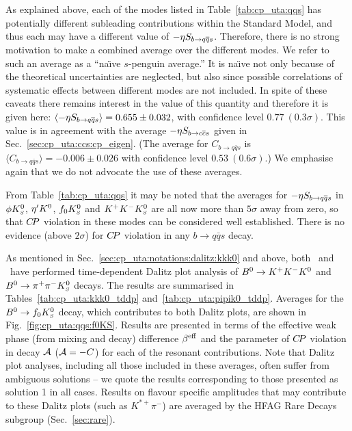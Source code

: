 As explained above,
each of the modes listed in Table~\ref{tab:cp_uta:qqs} has
potentially different subleading contributions within the Standard Model,
and thus each may have a different value of $-\etacp S_{b \to q\bar q s}$.
Therefore, there is no strong motivation to make a combined average
over the different modes.
We refer to such an average as a ``na\"\i ve $s$-penguin average.''
It is na\"\i ve not only because of the theoretical uncertainties are neglected,
but also since possible correlations of systematic effects 
between different modes are not included.
In spite of these caveats there remains interest in the value of this quantity
and therefore it is given here:
$\langle -\etacp S_{b \to q\bar q s} \rangle = 0.655 \pm 0.032$,
with confidence level $0.77~(0.3\sigma)$.
This value is in agreement with the average 
$-\etacp S_{b \to c\bar c s}$ given in Sec.~\ref{sec:cp_uta:ccs:cp_eigen}.
(The average for $C_{b \to q\bar q s}$ is 
$\langle C_{b \to q\bar q s} \rangle = -0.006 \pm 0.026$
with confidence level $0.53~(0.6\sigma)$.)
We emphasise again that we do not advocate the use of these averages.

From Table~\ref{tab:cp_uta:qqs} it may be noted 
that the averages for $-\etacp S_{b \to q\bar q s}$ in 
$\phi K^0_{\scriptscriptstyle S}$, ${\eta^{\prime}} K^0$, $f_0K^0_{\scriptscriptstyle S}$ and $K^+K^-K^0_{\scriptscriptstyle S}$
are all now more than $5\sigma$ away from zero, 
so that $C\!P$ violation in these modes can be considered well established.
There is no evidence (above $2\sigma$) for $C\!P$ violation in any $b \to q \bar q s$ decay.

\label{sec:cp_uta:qqs:dp}

As mentioned in Sec.~\ref{sec:cp_uta:notations:dalitz:kkk0} and above,
both \babar\ and \belle\ have performed time-dependent Dalitz plot analysis of
$B^0 \to K^+K^-K^0$ and $B^0 \to \pi^+\pi^-K^0_{\scriptscriptstyle S}$ decays.
The results are summarised in Tables~\ref{tab:cp_uta:kkk0_tddp} 
and~\ref{tab:cp_uta:pipik0_tddp}.
Averages for the $B^0\to f_0 K^0_{\scriptscriptstyle S}$ decay, which contributes to both Dalitz
plots, are shown in Fig.~\ref{fig:cp_uta:qqs:f0KS}.
Results are presented in terms of the effective weak phase (from mixing and
decay) difference $\beta^{\rm eff}$ and the parameter of $C\!P$ violation in decay
${\cal A}$ (${\cal A} = -C$) for each of the resonant contributions.
Note that Dalitz plot analyses, including all those included in these
averages, often suffer from ambiguous solutions -- we quote the results
corresponding to those presented as solution 1 in all cases.
Results on flavour specific amplitudes that may contribute to these Dalitz
plots (such as $K^{*+}\pi^-$) are averaged by the HFAG Rare Decays subgroup 
(Sec.~\ref{sec:rare}).

